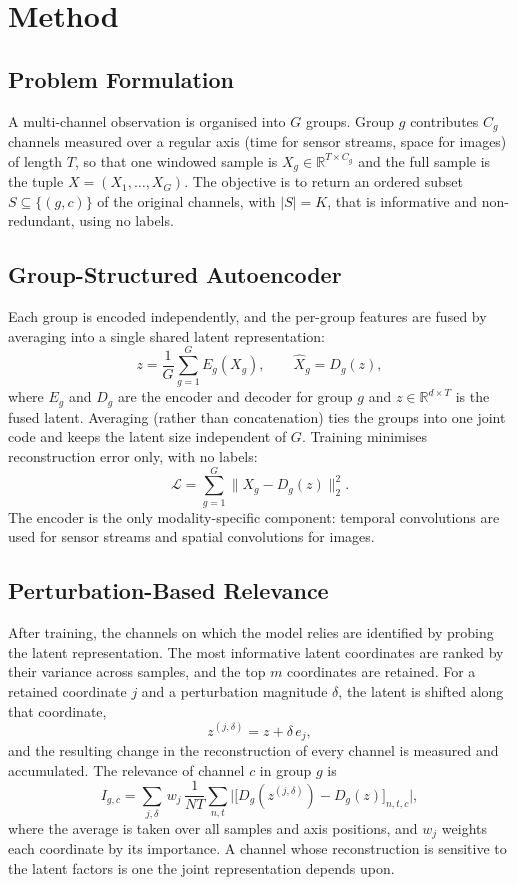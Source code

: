 \documentclass[conference]{IEEEtran}
\begin{document}
\section{Method}
\subsection{Problem Formulation}
A multi-channel observation is organised into $G$ groups. Group $g$ contributes
$C_g$ channels measured over a regular axis (time for sensor streams, space for
images) of length $T$, so that one windowed sample is
$X_g \in \mathbb{R}^{T \times C_g}$ and the full sample is the tuple
$X = (X_1,\dots,X_G)$. The objective is to return an ordered subset
$S \subseteq \{(g,c)\}$ of the original channels, with $|S| = K$, that is
informative and non-redundant, using no labels.

\subsection{Group-Structured Autoencoder}
Each group is encoded independently, and the per-group features are fused by
averaging into a single shared latent representation:
\begin{equation}
z = \frac{1}{G}\sum_{g=1}^{G} E_g(X_g), \qquad
\hat{X}_g = D_g(z),
\end{equation}
where $E_g$ and $D_g$ are the encoder and decoder for group $g$ and
$z \in \mathbb{R}^{d \times T}$ is the fused latent. Averaging (rather than
concatenation) ties the groups into one joint code and keeps the latent size
independent of $G$. Training minimises reconstruction error only, with no labels:
\begin{equation}
\mathcal{L} = \sum_{g=1}^{G}\big\| X_g - D_g(z) \big\|_2^2 .
\end{equation}
The encoder is the only modality-specific component: temporal convolutions are
used for sensor streams and spatial convolutions for images.

\subsection{Perturbation-Based Relevance}
After training, the channels on which the model relies are identified by probing
the latent representation. The most informative latent coordinates are ranked by
their variance across samples, and the top $m$ coordinates are retained. For a
retained coordinate $j$ and a perturbation magnitude $\delta$, the latent is
shifted along that coordinate,
\begin{equation}
z^{(j,\delta)} = z + \delta\, e_j,
\end{equation}
and the resulting change in the reconstruction of every channel is measured and
accumulated. The relevance of channel $c$ in group $g$ is
\begin{equation}
I_{g,c} = \!\!\sum_{j,\delta}\, w_j \,
\frac{1}{NT}\sum_{n,t}
\Big| \big[D_g(z^{(j,\delta)}) - D_g(z)\big]_{n,t,c} \Big|,
\end{equation}
where the average is taken over all samples and axis positions, and $w_j$ weights
each coordinate by its importance. A channel whose reconstruction is sensitive to
the latent factors is one the joint representation depends upon.
\end{document}

